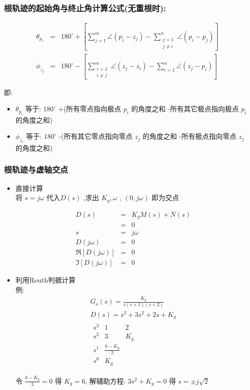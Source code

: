 \documentclass{article}
\begin{document}
\begin{frame}
\frametitle{根轨迹的起始角与终止角计算公式(无重根时):}
\label{sec-2-1-11}

   
\begin{eqnarray*}
\theta_{p_i} & = & 180^{\circ}+\left[\sum_{j=1}^m\angle(p_i-z_j)-\sum_{\substack{j=1 \\ j\neq i}}^n\angle(p_i-p_j)\right] \\
\phi_{z_j} & = & 180^{\circ}-\left[\sum_{\substack{i=1 \\ i\neq j}}^m\angle(z_j-z_i)-\sum_{i=1}^n\angle(z_j-p_i)\right] 
\end{eqnarray*}

即:
\begin{itemize}
\item $\theta_{p_i}$  等于:  $180^{\circ}$  +(所有零点指向极点 $p_i$ 的角度之和 -所有其它极点指向极点 $p_i$ 的角度之和)
\item $\phi_{z_i}$ 等于: $180^{\circ}$ -(所有其它零点指向零点 $z_j$ 的角度之和 -所有极点指向零点 $z_j$ 的角度之和)
\end{itemize}
\end{frame}
\begin{frame}
\frametitle{根轨迹与虚轴交点}
\label{sec-2-1-12}
\begin{itemize}

\item 直接计算\\
\label{sec-2-1-12-1}%
将 $s=j\omega$ 代入$D(s)$ ,求出 $K_g,\omega$ , $(0,j\omega)$ 即为交点

\begin{eqnarray*}
D(s) &= &K_gM(s)+N(s) \\
 &=& 0 \\
s &=& j\omega \\
D(j\omega) &=& 0 \\
\Re[D(j\omega)] &=& 0\\
\Im[D(j\omega)] &=& 0
\end{eqnarray*}


\item 利用Routh判据计算\\
\label{sec-2-1-12-2}%
例:
\begin{gather*}
G_o(s)  =  \frac{K_g}{s(s+1)(s+2)} \\
D(s)  = s^3+3s^2+2s+K_g \\
\begin{matrix}
s^3  &  1 &  2 \\
s^2  &  3  &  K_g \\
s^1  & \frac{6-K_g}{3} \\
s^0  & K_g
\end{matrix}
\end{gather*}

令 $\frac{6-K_g}{3}=0$ 得 $K_g=6$, 解辅助方程: $3s^2+K_g=0$ 得 $s=\pm j\sqrt{2}$
\end{itemize} %
\end{frame}
\end{document}
